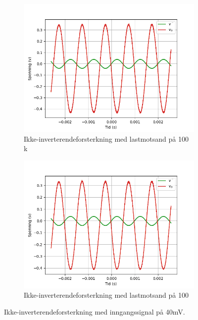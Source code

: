 \begin{figure}[H]
    \centering
    \begin{subfigure}{.5\textwidth}
        \centering
        \includegraphics[width=1\linewidth]{./Images/03Research/noninverting100k.png}
        \caption{Ikke-inverterendeforsterkning med lastmotsand på 100 k\text{$\Omega$}}
        \label{fig:ikkeinv100k}
    \end{subfigure}%
    \begin{subfigure}{.5\textwidth}
        \centering
        \includegraphics[width=1\linewidth]{./Images/03Research/noninverting100.png}
        \caption{Ikke-inverterendeforsterkning med lastmotsand på 100 \text{$\Omega$}}
        \label{fig:ikkeinv100}
    \end{subfigure}
    \caption{Ikke-inverterendeforsterkning med inngangssignal på 40mV.}
    \label{fig:ikkeinv}
\end{figure}

